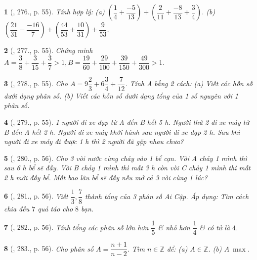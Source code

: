 \documentclass{article}
\newtheorem{baitoan}{}
\begin{document}
\begin{baitoan}[\cite{Tuyen_Toan_6}, 276., p. 55]
	Tính hợp lý: (a) $\left(\dfrac{1}{4} + \dfrac{-5}{13}\right) + \left(\dfrac{2}{11} + \dfrac{-8}{13} + \dfrac{3}{4}\right)$. (b) $\left(\dfrac{21}{31} + \dfrac{-16}{7}\right) + \left(\dfrac{44}{53} + \dfrac{10}{31}\right) + \dfrac{9}{53}$.
\end{baitoan}

\begin{baitoan}[\cite{Tuyen_Toan_6}, 277., p. 55]
	Chứng minh $A = \dfrac{3}{8} + \dfrac{3}{15} + \dfrac{3}{7} > 1,B = \dfrac{19}{60} + \dfrac{29}{100} + \dfrac{39}{150} + \dfrac{49}{300} > 1$.
\end{baitoan}

\begin{baitoan}[\cite{Tuyen_Toan_6}, 278., p. 55]
	Cho $A = 9\dfrac{2}{3} + 6\dfrac{3}{4} + \dfrac{7}{12}$. Tính A bằng 2 cách: (a) Viết các hỗn số dưới dạng phân số. (b) Viết các hỗn số dưới dạng tổng của 1 số nguyên với 1 phân số.
\end{baitoan}

\begin{baitoan}[\cite{Tuyen_Toan_6}, 279., p. 55]
	1 người đi xe đạp từ A đến B hết {\rm5 h}. Người thứ 2 đi xe máy từ B đến A hết {\rm2 h}. Người đi xe máy khởi hành sau người đi xe đạp {\rm2 h}. Sau khi người đi xe máy đi được {\rm1 h} thì 2 người đã gặp nhau chưa?
\end{baitoan}

\begin{baitoan}[\cite{Tuyen_Toan_6}, 280., p. 56]
	Cho 3 vòi nước cùng chảy vào 1 bể cạn. Vòi A chảy 1 mình thì sau {\rm6 h} bể sẽ đầy. Vòi B chảy 1 mình thì mất {\rm3 h} còn vòi C chảy 1 mình thì mất {\rm2 h} mới đầy bể. Mất bao lâu bể sẽ đầy nếu mở cả 3 vòi cùng 1 lúc?
\end{baitoan}

\begin{baitoan}[\cite{Tuyen_Toan_6}, 281., p. 56]
	Viết $\dfrac{1}{3},\dfrac{7}{8}$ thành tổng của 3 phân số Ai Cập. Áp dụng: Tìm cách chia đều $7$ quả táo cho $8$ bạn.
\end{baitoan}

\begin{baitoan}[\cite{Tuyen_Toan_6}, 282., p. 56]
	Tính tổng các phân số lớn hơn $\dfrac{1}{5}$ \& nhỏ hơn $\dfrac{1}{4}$ \& có tử là $4$.
\end{baitoan}

\begin{baitoan}[\cite{Tuyen_Toan_6}, 283., p. 56]
	Cho phân số $A = \dfrac{n + 1}{n - 2}$. Tìm $n\in\mathbb{Z}$ để: (a) $A\in\mathbb{Z}$. (b) $A\ \max$.
\end{baitoan}
\end{document}
